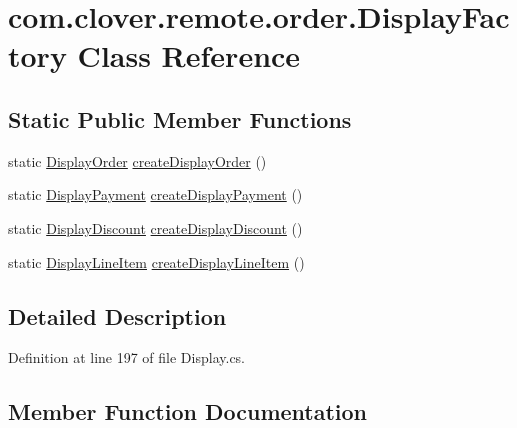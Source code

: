 \hypertarget{classcom_1_1clover_1_1remote_1_1order_1_1_display_factory}{}\section{com.\+clover.\+remote.\+order.\+Display\+Factory Class Reference}
\label{classcom_1_1clover_1_1remote_1_1order_1_1_display_factory}
\subsection*{Static Public Member Functions}
\begin{DoxyCompactItemize}
\item 
static \hyperlink{classcom_1_1clover_1_1remote_1_1order_1_1_display_order}{Display\+Order} \hyperlink{classcom_1_1clover_1_1remote_1_1order_1_1_display_factory_a7cde52879c3985866042d4003f84f707}{create\+Display\+Order} ()
\item 
static \hyperlink{classcom_1_1clover_1_1remote_1_1order_1_1_display_payment}{Display\+Payment} \hyperlink{classcom_1_1clover_1_1remote_1_1order_1_1_display_factory_aaadbdd4904ce0d467b0f72f09c8cca0b}{create\+Display\+Payment} ()
\item 
static \hyperlink{classcom_1_1clover_1_1remote_1_1order_1_1_display_discount}{Display\+Discount} \hyperlink{classcom_1_1clover_1_1remote_1_1order_1_1_display_factory_a14100724948cd140871689bbfcd4fa68}{create\+Display\+Discount} ()
\item 
static \hyperlink{classcom_1_1clover_1_1remote_1_1order_1_1_display_line_item}{Display\+Line\+Item} \hyperlink{classcom_1_1clover_1_1remote_1_1order_1_1_display_factory_a8f52f32167d86c81caaebdd5debb4d70}{create\+Display\+Line\+Item} ()
\end{DoxyCompactItemize}


\subsection{Detailed Description}


Definition at line 197 of file Display.\+cs.



\subsection{Member Function Documentation}
\mbox{\label{classcom_1_1clover_1_1remote_1_1order_1_1_display_factory_a14100724948cd140871689bbfcd4fa68}} 
